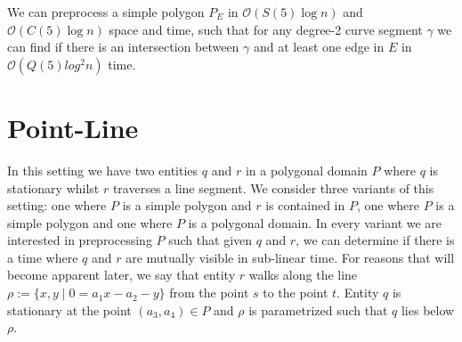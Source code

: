 \documentclass[a4paper, UKenglish]{lipics-v2018}
\begin{document}
\begin{theorem}
    We can preprocess a simple polygon $P_E$ in $\mathcal{O}(S(5) \log n)$ and $\mathcal{O}(C(5) \log n)$ space and time, such that for any degree-2 curve segment $\gamma$ we can find if there is an intersection between $\gamma$ and at least one edge in $E$ in $\mathcal{O}( Q(5) log^2 n)$ time. 
\end{theorem}

\section{Point-Line}


In this setting we have two entities $q$ and $r$ in a polygonal domain $P$ where $q$ is stationary whilst $r$ traverses a line segment. We consider three variants of this setting: one where $P$ is a simple polygon and $r$ is contained in $P$, one where $P$ is a simple polygon and one where $P$ is a polygonal domain. In every variant we are interested in preprocessing $P$ such that given $q$ and $r$, we can determine if there is a time where $q$ and $r$ are mutually visible in sub-linear time. For reasons that will become apparent later, we say that entity $r$ walks along the line $\rho := \{ x,y \mid  0 = a_1 x - a_2 - y \}$ from the point $s$ to the point $t$. Entity $q$ is stationary at the point $(a_3, a_4) \in P$ and $\rho$ is parametrized such that $q$ lies below $\rho$.
\end{document}
